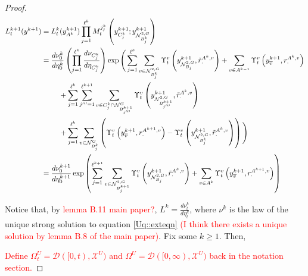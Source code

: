 \documentclass[12pt]{article}
\newcommand{\mc}{\mathcal}
\newcommand{\ov}{\overline}
\newcommand{\tr}{\textcolor{red}}
\newcommand{\cad}{\mc{D}}							%
\newcommand{\sta}{\mc{X}}							%
\newcommand{\gneigh}[2]{\mc{N}^{#1}_{#2}}			%
\newcommand{\dgneigh}[2]{\mc{N}^{2,#1}_{#2}}		%
\newcommand{\cl}[1]{\ov{#1}}						%
\newcommand{\indx}[1]{^{#1}}						%
\newcommand{\rate}{r}								%
\newcommand{\xg}{y}									%
\newcommand{\vind}[1]{_{#1}}						%
\newcommand{\vpara}[1]{^{#1}}						%
\newcommand{\stpara}[1]{_{#1}}						%
\newcommand{\tpara}[1]{_{#1}}						%
\newcommand{\gvpara}[2]{^{#1,#2}}					%
\newcommand{\psize}{\ell}							%
\newcommand{\brate}{\alt{\rate}}					%
\newcommand{\alt}[1]{\tilde{#1}}					%
\newcommand{\mm}{\nu}								%
\newcommand{\mmm}{\eta}								%
\newcommand{\ds}{\Upsilon}							%
\newcommand{\dense}{L}								%
\newcommand{\mdense}{M}								%
\newcommand{\jpara}[1]{^{#1}}						%
\begin{document}
\begin{proof}
\begin{align*}
\dense\indx{k+1}\tpara{t}(\xg\indx{k+1}) &= \dense\indx{k}\tpara{t}(\xg\indx{k+1}\vind{A\indx{k}})\prod_{j=1}^{\psize\indx{k}}\mdense\jpara{j\indx{k}_j}\tpara{t}\left(\xg\indx{k+1}\vind{C_j\indx{k}};\xg\indx{k+1}\vind{\dgneigh{G}{B\indx{k}_j}}\right)\\
&= \frac{d\mm\indx{k}\tpara{0}}{d\mmm\indx{k}\tpara{0}}\left(\prod_{j=1}^{\psize\indx{k}}\frac{d\mm\vind{C_j\indx{k}}}{d\mmm\vind{C_j\indx{k}}}\right)\exp\Bigg(\sum_{j=1}^{\psize\indx{k}}\sum_{v\in \dgneigh{G}{B_j\indx{k}}} \ds\vpara{v}\tpara{t}\left(\xg\indx{k+1}\vind{\dgneigh{G}{B_j}},\brate\gvpara{A\indx{k}}{v}\stpara{\cdot}\right) + \sum_{v \in A\indx{k-1}} \ds\vpara{v}\tpara{t}\left(\xg\indx{k+1}\vind{\cl{v}},\rate\gvpara{A\indx{k}}{v}\stpara{\cdot}\right)\\
&\hspace{24 pt} + \sum_{j=1}^{\psize\indx{k}}\sum_{j'''=1}^{\psize\indx{k+1}}\sum_{v \in C_j\indx{k}\cap\gneigh{G}{B_{j'''}\indx{k+1}}}\ds\vpara{v}\tpara{t}\left(\xg\indx{k+1}\vind{\dgneigh{G}{B_{j'''}\indx{k+1}}},\brate\gvpara{A\indx{k}}{v}\stpara{\cdot}\right)\\
&\hspace{24pt} + \sum_{j=1}^{\psize\indx{k}}\sum_{v \in \gneigh{G}{B_j\indx{k}}}\left(\ds\vpara{v}\tpara{t}\left(\xg\indx{k+1}\vind{\cl{v}},\rate\gvpara{A\indx{k+1}}{v}\stpara{\cdot}\right) - \ds\vpara{v}\tpara{t}\left(\xg\indx{k+1}\vind{\dgneigh{G}{B_j\indx{k}}},\brate\gvpara{A\indx{k}}{v}\stpara{\cdot}\right)\right)\Bigg)\\
&= \frac{d\mm\indx{k+1}\tpara{0}}{d\mmm\indx{k+1}\tpara{0}}\exp\left(\sum_{j=1}^{\psize\indx{k+1}}\sum_{v\in \dgneigh{G}{B_j\indx{k+1}}} \ds\vpara{v}\tpara{t}\left(\xg\indx{k+1}\vind{\dgneigh{G}{B_j}},\brate\gvpara{A\indx{k}}{v}\stpara{\cdot}\right) + \sum_{v \in A\indx{k}}\ds\vpara{v}\tpara{t}\left(\xg\vind{\cl{v}}\indx{k+1},\rate\gvpara{A\indx{k+1}}{v}\stpara{\cdot}\right)\right)
\end{align*}

Notice that, by \tr{lemma B.11 main paper?}, \(\dense\indx{k} = \frac{d\mm\indx{k}\tpara{t}}{d\mmm\indx{k}\tpara{t}}\), where \(\mm\indx{k}\) is the law of the unique strong solution to equation \eqref{Uq::exteqn} \tr{(I think there exists a unique solution by lemma B.8 of the main paper)}. Fix some \(k \geq 1\). Then,

\tr{Define \(\Omega\vpara{U}\tpara{t} = \cad([0,t),\sta^U)\) and \(\Omega\vpara{U} = \cad([0,\infty),\sta^U)\) back in the notation section.}


\end{proof}
\end{document}
